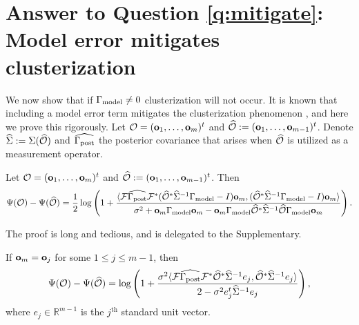 \section{Answer to Question \ref{q:mitigate}: Model error mitigates clusterization}\label{section:non_vanishing}
We now show that if $\Gamma_{\textup{model}} \neq 0$ clusterization will not occur. It
is known that including a model error term mitigates the
clusterization phenomenon \citet{Ucinski05}, and here we prove this
rigorously. Let $\mathcal{O} = (\mathbf{o}_1,\dots,\mathbf{o}_m)^t$ and $\widehat{\mathcal{O}} :=
(\mathbf{o}_1,\dots,\mathbf{o}_{m-1})^t$. Denote $\widehat{\Sigma} := \Sigma (\widehat{\mathcal{O}})$ and
$\widehat{\Gamma_{\textup{post}}}$ the posterior covariance that arises when $\widehat{\mathcal{O}}$ is
utilized as a measurement operator.

\begin{proposition}\label{prop:design_increase}
  Let $\mathcal{O} = (\mathbf{o}_1,\dots,\mathbf{o}_m)^t$ and $\widehat{\mathcal{O}} :=
  (\mathbf{o}_1,\dots,\mathbf{o}_{m-1})^t$. Then
  \begin{equation}\label{eq:conclusion}
    \tar( \obs ) - \tar (\obsm ) =
    \frac12 \log \left ( 1 + \frac{
      \langle \fwd \postcovm \fwd^* (\obsm^* \Sigmam^{-1} \modcov - I ) \meas_m,
      (\obsm^* \Sigmam^{-1} \modcov - I ) \meas_m \rangle
    }{
      \sigma^2 + \meas_m \modcov \meas_m - \meas_m \modcov \obsm^* \Sigmam^{-1} \obsm \modcov \meas_m 
    }       
    \right ).
  \end{equation}
\end{proposition}
The proof is long and tedious, and is delegated to the Supplementary.


\begin{corollary}\label{cor:same_meas}
  If $\mathbf{o}_m = \mathbf{o}_j$ for some $1 \leq j \leq m-1$, then
  \begin{equation*}
    \tar(\obs) - \tar(\obsm) =
    \log \left ( 1 + \frac{\sigma^2
      \langle \fwd \postcovm \fwd^* \obsm^* \Sigmam^{-1} e_j,
      \obsm^* \Sigmam^{-1}e_j \rangle
    }{
      2 - \sigma^2 e_j^t\Sigmam^{-1}e_j 
    }       
    \right ),
  \end{equation*}
  where $e_j\in \mathbb{R}^{m-1}$ is the $j^{\text{th}}$ standard unit
  vector.
\end{corollary}

